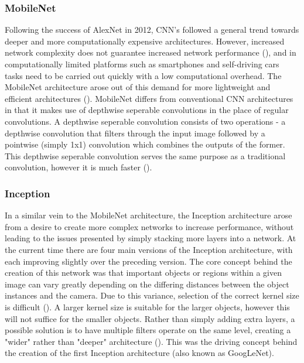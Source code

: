 \documentclass[12pt]{report}
\begin{document}
\subsubsection{MobileNet}
\begin{flushleft}
Following the success of AlexNet in 2012, CNN's followed a general trend towards deeper and more computationally expensive architectures. However, increased network complexity does not guarantee increased network performance (\cite{szegedy2016rethinking}), and in computationally limited platforms such as smartphones and self-driving cars tasks need to be carried out quickly with a low computational overhead. The MobileNet architecture arose out of this demand for more lightweight and efficient architectures (\cite{howard2017mobilenets}). MobileNet differs from conventional CNN architectures in that it makes use of depthwise seperable convolutions in the place of regular convolutions. A depthwise seperable convolution consists of two operations - a depthwise convolution that filters through the input image followed by a pointwise (simply 1x1) convolution which combines the outputs of the former. This depthwise seperable convolution serves the same purpose as a traditional convolution, however it is much faster (\cite{howard2017mobilenets}).
\end{flushleft}

\subsubsection{Inception}
\begin{flushleft}
In a similar vein to the MobileNet architecture, the Inception architecture arose from a desire to create more complex networks to increase performance, without leading to the issues presented by simply stacking more layers into a  network. At the current time there are four main versions of the Inception architecture, with each improving slightly over the preceding version. The core concept behind the creation of this network was that important objects or regions within a given image can vary greatly depending on the differing distances between the object instances and the camera. Due to this variance, selection of the correct kernel size is difficult (\cite{szegedy2016rethinking}). A larger kernel size is suitable for the larger objects, however this will not suffice for the smaller objects. Rather than simply adding extra layers, a possible solution is to have multiple filters operate on the same level, creating a "wider" rather than "deeper" architecture (\cite{szegedy2016rethinking}). This was the driving concept behind the creation of the first Inception architecture (also known as GoogLeNet).
\end{flushleft}
\end{document}

